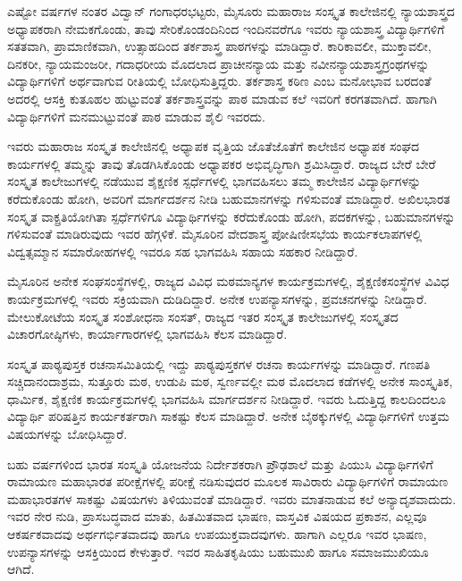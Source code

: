 {ಎಷ್ಟೋ ವರ್ಷಗಳ ನಂತರ ವಿದ್ವಾನ್ ಗಂಗಾಧರಭಟ್ಟರು, ಮೈಸೂರು ಮಹಾರಾಜ ಸಂಸ್ಕೃತ ಕಾಲೇಜಿನಲ್ಲಿ ನ್ಯಾಯಶಾಸ್ತ್ರದ ಅಧ್ಯಾಪಕರಾಗಿ ನೇಮಕಗೊಂಡು, ತಾವು ಸೇರಿಕೊಂಡಂದಿನಿಂದ ಇಂದಿನವರೆಗೂ ಇವರು ನ್ಯಾಯಶಾಸ್ತ್ರ ವಿದ್ಯಾರ್ಥಿಗಳಿಗೆ ಸತತವಾಗಿ, ಪ್ರಾಮಾಣಿಕವಾಗಿ, ಉತ್ಸಾಹದಿಂದ ತರ್ಕಶಾಸ್ತ್ರ ಪಾಠಗಳನ್ನು ಮಾಡಿದ್ದಾರೆ. ಕಾರಿಕಾವಲೀ, ಮುಕ್ತಾವಲೀ, ದಿನಕರೀ, ನ್ಯಾಯಮಂಜರೀ, ಗದಾಧರೀಯ ಮೊದಲಾದ ಪ್ರಾಚೀನನ್ಯಾಯ ಮತ್ತು ನವೀನನ್ಯಾಯಶಾಸ್ತ್ರಗ್ರಂಥಗಳನ್ನು ವಿದ್ಯಾರ್ಥಿಗಳಿಗೆ ಅರ್ಥವಾಗುವ ರೀತಿಯಲ್ಲಿ ಬೋಧಿಸುತ್ತಿದ್ದರು. ತರ್ಕಶಾಸ್ತ್ರ ಕಠಿಣ ಎಂಬ ಮನೋಭಾವ ಬರದಂತೆ ಅದರಲ್ಲಿ ಆಸಕ್ತಿ ಕುತೂಹಲ ಹುಟ್ಟುವಂತೆ ತರ್ಕಶಾಸ್ತ್ರವನ್ನು ಪಾಠ ಮಾಡುವ ಕಲೆ ಇವರಿಗೆ ಕರಗತವಾಗಿದೆ. ಹಾಗಾಗಿ ವಿದ್ಯಾರ್ಥಿಗಳಿಗೆ ಮನಮುಟ್ಟುವಂತೆ ಪಾಠ ಮಾಡುವ ಶೈಲಿ ಇವರದು.

ಇವರು ಮಹಾರಾಜ ಸಂಸ್ಕೃತ ಕಾಲೇಜಿನಲ್ಲಿ ಅಧ್ಯಾಪಕ ವೃತ್ತಿಯ ಜೊತೆಜೊತೆಗೆ ಕಾಲೇಜಿನ ಅಧ್ಯಾಪಕ ಸಂಘದ ಕಾರ್ಯಗಳಲ್ಲಿ ತಮ್ಮನ್ನು ತಾವು ತೊಡಗಿಸಿಕೊಂಡು ಅಧ್ಯಾಪಕರ ಅಭಿವೃದ್ಧಿಗಾಗಿ ಶ್ರಮಿಸಿದ್ದಾರೆ. ರಾಜ್ಯದ ಬೇರೆ ಬೇರೆ ಸಂಸ್ಕೃತ ಕಾಲೇಜುಗಳಲ್ಲಿ ನಡೆಯುವ ಶೈಕ್ಷಣಿಕ ಸ್ಪರ್ಧೆಗಳಲ್ಲಿ ಭಾಗವಹಿಸಲು ತಮ್ಮ ಕಾಲೇಜಿನ ವಿದ್ಯಾರ್ಥಿಗಳನ್ನು ಕರೆದುಕೊಂಡು ಹೋಗಿ, ಅವರಿಗೆ ಮಾರ್ಗದರ್ಶನ ನೀಡಿ ಬಹುಮಾನಗಳನ್ನು ಗಳಿಸು\-ವಂತೆ ಮಾಡಿದ್ದಾರೆ. ಅಖಿಲಭಾರತ ಸಂಸ್ಕೃತ ವಾಕ್ಪ್ರತಿಯೋಗಿತಾ ಸ್ಪರ್ಧೆಗಳಿಗೂ ವಿದ್ಯಾರ್ಥಿಗಳನ್ನು ಕರೆದುಕೊಂಡು ಹೋಗಿ, ಪದಕಗಳನ್ನು, ಬಹುಮಾನಗಳನ್ನು ಗಳಿಸುವಂತೆ ಮಾಡಿರುವುದು ಇವರ ಹೆಗ್ಗಳಿಕೆ. ಮೈಸೂರಿನ ವೇದಶಾಸ್ತ್ರ ಪೋಷಿಣೀಸಭೆಯ ಕಾರ್ಯಕಲಾಪಗಳಲ್ಲಿ ವಿದ್ವತ್ಸಮ್ಮಾನ  \enginline{-}  ಸಮಾರೋಹಗಳಲ್ಲಿ ಇವರೂ ಸಹ ಭಾಗವಹಿಸಿ ಸಹಾಯ  \enginline{-}  ಸಹಕಾರ ನೀಡಿದ್ದಾರೆ.

ಮೈಸೂರಿನ ಅನೇಕ ಸಂಘಸಂಸ್ಥೆಗಳಲ್ಲಿ, ರಾಜ್ಯದ ವಿವಿಧ ಮಠಮಾನ್ಯಗಳ ಕಾರ್ಯಕ್ರಮಗಳಲ್ಲಿ, ಶೈಕ್ಷಣಿಕಸಂಸ್ಥೆಗಳ ವಿವಿಧ ಕಾರ್ಯಕ್ರಮಗಳಲ್ಲಿ ಇವರು ಸಕ್ರಿಯವಾಗಿ ದುಡಿದಿದ್ದಾರೆ. ಅನೇಕ ಉಪನ್ಯಾಸಗಳನ್ನು, ಪ್ರವಚನಗಳನ್ನು ನೀಡಿದ್ದಾರೆ. ಮೇಲು\-ಕೋಟೆಯ ಸಂಸ್ಕೃತ ಸಂಶೋಧನಾ ಸಂಸತ್, ರಾಜ್ಯದ ಇತರ ಸಂಸ್ಕೃತ ಕಾಲೇಜುಗಳಲ್ಲಿ ಸಂಸ್ಕೃತದ ವಿಚಾರಗೋಷ್ಠಿಗಳು, ಕಾರ್ಯಾಗಾರಗಳಲ್ಲಿ ಭಾಗವಹಿಸಿ ಕೆಲಸ ಮಾಡಿದ್ದಾರೆ. 

ಸಂಸ್ಕೃತ ಪಾಠ್ಯಪುಸ್ತಕ ರಚನಾಸಮಿತಿಯಲ್ಲಿ ಇದ್ದು ಪಾಠ್ಯಪುಸ್ತಕಗಳ ರಚನಾ ಕಾರ್ಯಗಳನ್ನು ಮಾಡಿದ್ದಾರೆ. ಗಣಪತಿ ಸಚ್ಚಿದಾನಂದಾಶ್ರಮ, ಸುತ್ತೂರು ಮಠ, ಉಡುಪಿ ಮಠ, ಸ್ವರ್ಣವಲ್ಲೀ ಮಠ ಮೊದಲಾದ ಕಡೆಗಳಲ್ಲಿ ಅನೇಕ ಸಾಂಸ್ಕೃತಿಕ, ಧಾರ್ಮಿಕ, ಶೈಕ್ಷಣಿಕ ಕಾರ್ಯಕ್ರಮಗಳಲ್ಲಿ ಭಾಗವಹಿಸಿ ಮಾರ್ಗದರ್ಶನ ನೀಡಿದ್ದಾರೆ. ಇವರು ಓದುತ್ತಿದ್ದ ಕಾಲದಿಂದಲೂ ವಿದ್ಯಾರ್ಥಿ ಪರಿಷತ್ತಿನ ಕಾರ್ಯಕರ್ತರಾಗಿ ಸಾಕಷ್ಟು ಕೆಲಸ ಮಾಡಿದ್ದಾರೆ. ಅನೇಕ ಬೈಠಕ್ಕುಗಳಲ್ಲಿ ವಿದ್ಯಾರ್ಥಿಗಳಿಗೆ ಉತ್ತಮ ವಿಷಯಗಳನ್ನು ಬೋಧಿಸಿದ್ದಾರೆ. 

ಬಹು ವರ್ಷಗಳಿಂದ ಭಾರತ ಸಂಸ್ಕೃತಿ ಯೋಜನೆಯ ನಿರ್ದೇಶಕರಾಗಿ ಪ್ರೌಢಶಾಲೆ ಮತ್ತು ಪಿಯುಸಿ ವಿದ್ಯಾರ್ಥಿಗಳಿಗೆ ರಾಮಾಯಣ  \enginline{-}  ಮಹಾಭಾರತ ಪರೀಕ್ಷೆಗಳಲ್ಲಿ ಪರೀಕ್ಷೆ ನಡಿಸುವುದರ ಮೂಲಕ ಸಾವಿರಾರು ವಿದ್ಯಾರ್ಥಿಗಳಿಗೆ ರಾಮಾಯಣ  \enginline{-}  ಮಹಾಭಾರತಗಳ ಸಾಕಷ್ಟು ವಿಷಯಗಳು ತಿಳಿಯುವಂತೆ ಮಾಡಿದ್ದಾರೆ. ಇವರು ಮಾತನಾಡುವ ಕಲೆ ಅನ್ಯಾದೃಶವಾದುದು. ಇವರ ನೇರ ನುಡಿ, ಪ್ರಾಸಬದ್ಧವಾದ ಮಾತು, ಹಿತಮಿತವಾದ ಭಾಷಣ, ವಾಸ್ತವಿಕ ವಿಷಯದ ಪ್ರಕಾಶನ, ಎಲ್ಲವೂ ಆಕರ್ಷಕವಾದವು ಅರ್ಥಗರ್ಭಿತವಾದವು ಹಾಗೂ ಉಪಯುಕ್ತವಾದವುಗಳು. ಹಾಗಾಗಿ ಎಲ್ಲರೂ ಇವರ ಭಾಷಣ, ಉಪನ್ಯಾಸಗಳನ್ನು ಆಸಕ್ತಿಯಿಂದ ಕೇಳುತ್ತಾರೆ. ಇವರ ಸಾಹಿತಕೃಷಿಯು ಬಹುಮುಖಿ ಹಾಗೂ ಸಮಾಜಮುಖಿಯೂ ಆಗಿದೆ.

}
